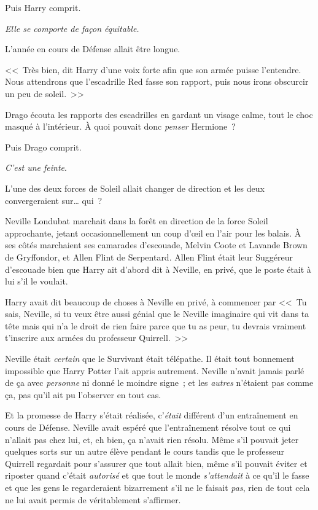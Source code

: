 Puis Harry comprit.

\emph{Elle se comporte de façon équitable.}

L'année en cours de Défense allait être longue.

<<~Très bien, dit Harry d'une voix forte afin que son armée puisse l'entendre. Nous attendrons que l'escadrille Red fasse son rapport, puis nous irons obscurcir un peu de soleil.~>>

\later

Drago écouta les rapports des escadrilles en gardant un visage calme, tout le choc masqué à l'intérieur. À quoi pouvait donc \emph{penser} Hermione~?

Puis Drago comprit.

\emph{C'est une feinte}.

L'une des deux forces de Soleil allait changer de direction et les deux convergeraient sur… qui~?

\later

Neville Londubat marchait dans la forêt en direction de la force Soleil approchante, jetant occasionnellement un coup d'œil en l'air pour les balais. À ses côtés marchaient ses camarades d'escouade, Melvin Coote et Lavande Brown de Gryffondor, et Allen Flint de Serpentard. Allen Flint était leur Suggéreur d'escouade bien que Harry ait d'abord dit à Neville, en privé, que le poste était à lui s'il le voulait.

Harry avait dit beaucoup de choses à Neville en privé, à commencer par <<~Tu sais, Neville, si tu veux être aussi génial que le Neville imaginaire qui vit dans ta tête mais qui n'a le droit de rien faire parce que tu as peur, tu devrais vraiment t'inscrire aux armées du professeur Quirrell.~>>

Neville était \emph{certain} que le Survivant était télépathe. Il était tout bonnement impossible que Harry Potter l'ait appris autrement. Neville n'avait jamais parlé de ça avec \emph{personne} ni donné le moindre signe~; et les \emph{autres} n'étaient pas comme ça, pas qu'il ait pu l'observer en tout cas.

Et la promesse de Harry s'était réalisée, c'\emph{était} différent d'un entraînement en cours de Défense. Neville avait espéré que l'entraînement résolve tout ce qui n'allait pas chez lui, et, eh bien, ça n'avait rien résolu. Même s'il pouvait jeter quelques sorts sur un autre élève pendant le cours tandis que le professeur Quirrell regardait pour s'assurer que tout allait bien, même s'il pouvait éviter et riposter quand c'était \emph{autorisé} et que tout le monde \emph{s'attendait} à ce qu'il le fasse et que les gens le regarderaient bizarrement s'il ne le faisait \emph{pas}, rien de tout cela ne lui avait permis de véritablement s'affirmer.

